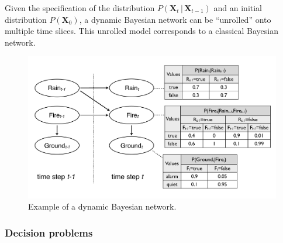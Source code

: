 Given the specification of the distribution $P(\mathbf{X}_t  \, | \,  \mathbf{X}_{t\!-\!1})$ and an initial distribution $P(\mathbf{X}_0)$, a dynamic Bayesian network can be ``unrolled'' onto multiple time slices.  This unrolled model corresponds to a classical Bayesian network.  

\begin{figure}[ht]
\centering
\includegraphics[scale=0.25]{imgs/dbn.pdf}
\caption{Example of a dynamic Bayesian network. }
\label{fig:dbn}
\end{figure}



\subsubsection*{Decision problems}

